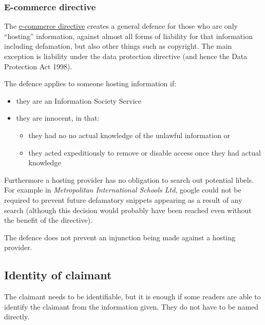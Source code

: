 \documentclass[]{article}
\begin{document}
\subsubsection{E-commerce directive}

The \href{http://eur-lex.europa.eu/legal-content/en/ALL/?uri=CELEX:32000L0031}{e-commerce directive} creates a general defence for those who are only ``hosting'' information, against almost all forms of liability for that information
including defamation, but also other things such as copyright. The main exception is liability under the data protection directive (and hence the Data Protection Act 1998). 

The defence applies to someone hosting information if:

\begin{itemize}
\item
  they are an Information Society Service
\item
  they are innocent, in that:

  \begin{itemize}
  \item
    they had no no actual knowledge of the unlawful information or
  \item
    they acted expeditiously to remove or disable access once they had actual knowledge
  \end{itemize}
\end{itemize}

Furthermore a hosting provider has no obligation to search out potential libels. For example in  \emph{Metropolitan International Schools Ltd}, google could not  be  required to prevent future defamatory snippets appearing as a result
  of any search (although this decision would probably have been reached
  even without the benefit of the directive).

The defence does not prevent an injunction being made against a hosting provider.

\subsection{Identity of claimant}

The claimant needs to be identifiable, but it is enough if some readers
are able to identify the claimant from the information given. They do
not have to be named directly.
\end{document}
